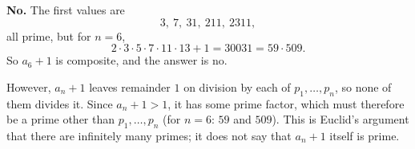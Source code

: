 \textbf{No.} The first values are
\[
3,\ 7,\ 31,\ 211,\ 2311,
\]
all prime, but for $n=6$,
\[
2\cdot3\cdot5\cdot7\cdot11\cdot13+1=30031=59\cdot509 .
\]
So $a_6+1$ is composite, and the answer is $\boxed{\text{no}}$.

However, $a_n+1$ leaves remainder $1$ on division by each of $p_1,\dots,p_n$, so none of them divides it. Since $a_n+1>1$, it has some prime factor, which must therefore be a prime other than $p_1,\dots,p_n$ (for $n=6$: $59$ and $509$). This is Euclid's argument that there are infinitely many primes; it does not say that $a_n+1$ itself is prime.
